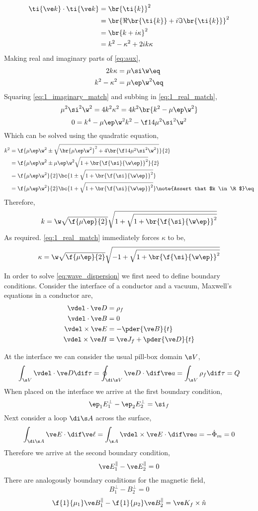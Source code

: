 \documentclass{article}
\begin{document}
\begin{align*}
\ti{\ve k}\cdot\ti{\ve k}
&= \br{\ti{k}}^2 \\
&= \br{\Re\br{\ti{k}} + i\Im\br{\ti{k}}}^2 \\
&= \br{k + i\kappa}^2 \\
&= k^2 - \kappa^2 + 2i k \kappa
\end{align*}
Making real and imaginary parts of \cref{eq:aux},
\begin{align*}
    2 k \kappa &= \mu \si \w \eq \label{eq:1_imaginary_match}\\
    k^2 - \kappa^2 &= \mu \ep \w^2 \eq \label{eq:1_real_match}
\end{align*}
Squaring \cref{eq:1_imaginary_match} and subbing in \cref{eq:1_real_match},
\[ \mu^2 \si^2 \w^2 = 4 k^2 \kappa^2 = 4 k^2 \br{k^2 - \mu \ep \w^2}  \]
\[ 0 = k^4 - \mu \ep \w^2 k^2 - \f14\mu^2 \si^2 \w^2  \]
Which can be solved using the quadratic equation,
\begin{align*}
k^2
&= \f{\mu \ep \w^2 \pm \sqrt{\br{\mu \ep \w^2}^2 + 4\br{\f14\mu^2 \si^2 \w^2}}}{2} \\
&= \f{\mu \ep \w^2 \pm \mu \ep \w^2 \sqrt{1 + \br{\f{\si}{\w\ep}}^2}}{2} \\
&= \f{\mu \ep \w^2}{2}\bc{1 \pm \sqrt{1 + \br{\f{\si}{\w\ep}}^2}} \\
&= \f{\mu \ep \w^2}{2}\bc{1 + \sqrt{1 + \br{\f{\si}{\w\ep}}^2}} \note{Assert that $k \in \R$} \eq \label{eq:quad_solve}\\
\end{align*}
Therefore,
\[ k = \w \sqrt{\f{\mu \ep}{2}}\sqrt{1 + \sqrt{1 + \br{\f{\si}{\w\ep}}^2}} \]
As required. \cref{eq:1_real_match} immediately forces $\kappa$ to be,
\[ \kappa = \w \sqrt{\f{\mu \ep}{2}}\sqrt{-1 + \sqrt{1 + \br{\f{\si}{\w\ep}}^2}} \]

In order to solve \cref{eq:wave_dispersion} we first need to define boundary conditions. Consider the interface of a conductor and a vacuum, Maxwell's equations in a conductor are,
\begin{align*}
    \vdel \cdot \ve D &= \rho_f \\
    \vdel \cdot \ve B &= 0 \\
    \vdel \times \ve E &= - \pder{\ve B}{t} \\
    \vdel \times \ve H &= \ve J_f + \pder{\ve D}{t}
\end{align*}

At the interface we can consider the usual pill-box domain $\s V$,
\[ \int_{\s V} \vdel \cdot \ve D \dif \tau = \oint_{\di \s V} \ve D \cdot \dif \ve a = \int_{\s V} \rho_f \dif \tau = Q \]
When placed on the interface we arrive at the first boundary condition,
\[ \ep_1 E_1^{\perp} - \ep_2 E_2^{\perp} = \si_f \]
Next consider a loop $\di \s A$ across the surface,
\[ \int_{\di \s A} \ve E \cdot \dif \ve \ell = \int_{\s A} \vdel \times \ve E \cdot \dif \ve a = - \dot \Phi_m = 0  \]
Therefore we arrive at the second boundary condition,
\[ \ve E_1^{\parallel} - \ve E_{2}^{\parallel} = 0 \]
There are analogously boundary conditions for the magnetic field,
\[ B_1^{\perp} - B_2^{\perp} = 0 \]
\[ \f{1}{\mu_1}\ve B_1^{\parallel} - \f{1}{\mu_2}\ve B_2^{\parallel} = \ve K_f \times \hat n \]
\end{document}

